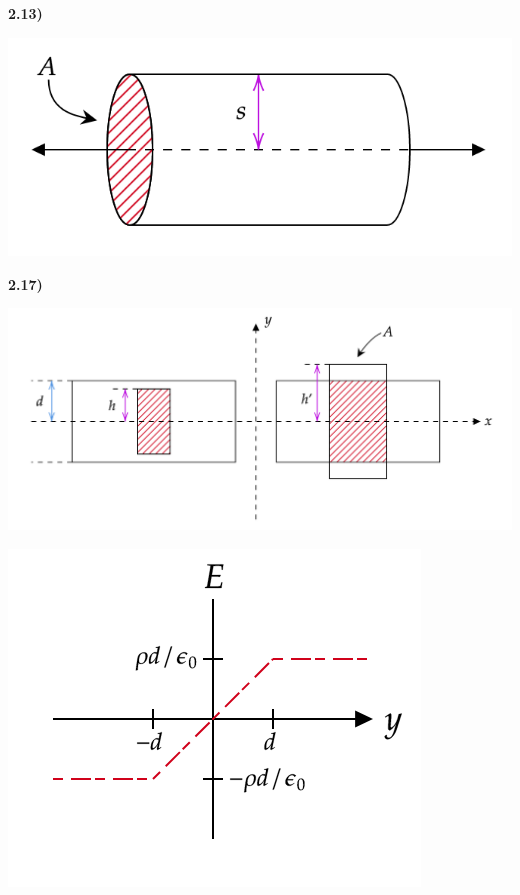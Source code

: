 \documentclass[12pt,a4paper]{article}
\newcommand{\prob}[2]{\textbf{#1)} #2}
\begin{document}
\prob{2.13}{}

\bef
\includegraphics[scale=0.5]{fig1.png}
\eef

\prob{2.17}{}

\bef
\includegraphics[scale=0.35]{fig2.png}
\eef

\bef
\includegraphics[scale=0.8]{fig3.png}
\eef
\end{document}
